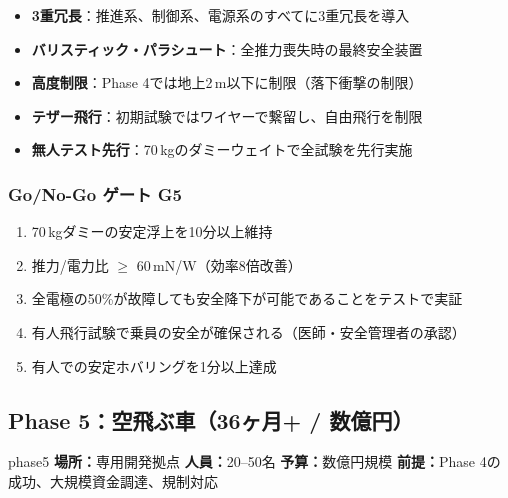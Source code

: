 \documentclass[12pt,a4paper]{ltjsarticle}
\begin{document}
\begin{warningbox}[有人フェーズの安全要件]
\begin{itemize}[leftmargin=2em]
  \item \textbf{3重冗長}：推進系、制御系、電源系のすべてに3重冗長を導入
  \item \textbf{バリスティック・パラシュート}：全推力喪失時の最終安全装置
  \item \textbf{高度制限}：Phase 4では地上2\,m以下に制限（落下衝撃の制限）
  \item \textbf{テザー飛行}：初期試験ではワイヤーで繋留し、自由飛行を制限
  \item \textbf{無人テスト先行}：70\,kgのダミーウェイトで全試験を先行実施
\end{itemize}
\end{warningbox}

\subsubsection{Go/No-Go ゲート G5}

\begin{successbox}[G5通過条件]
\begin{enumerate}[leftmargin=2em]
  \item 70\,kgダミーの安定浮上を10分以上維持
  \item 推力/電力比 $\geq$ 60\,mN/W（効率8倍改善）
  \item 全電極の50\%が故障しても安全降下が可能であることをテストで実証
  \item 有人飛行試験で乗員の安全が確保される（医師・安全管理者の承認）
  \item 有人での安定ホバリングを1分以上達成
\end{enumerate}
\end{successbox}

\newpage
\subsection{Phase 5：空飛ぶ車（36ヶ月+ / 数億円）}

\begin{phasebox}{phase5}
\textbf{場所：}専用開発拠点 \quad
\textbf{人員：}20--50名 \quad
\textbf{予算：}数億円規模 \quad
\textbf{前提：}Phase 4の成功、大規模資金調達、規制対応
\end{phasebox}
\end{document}
